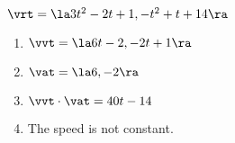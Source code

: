 {$\vrt = \la 3t^2-2t+1, -t^2+t+14\ra$
}
{\begin{enumerate}
\item $\vvt = \la 6t-2,-2t+1\ra$
\item $\vat = \la6,-2 \ra$
\item $\vvt \cdot \vat = 40t-14$
\item The speed is not constant.
\end{enumerate}
}

